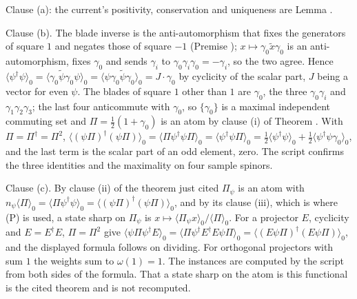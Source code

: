 Clause (a): the current's positivity, conservation and uniqueness are Lemma .

Clause (b). The blade inverse is the anti-automorphism that fixes the generators of square $1$ and negates those of square $-1$ (Premise ); $x \mapsto \gamma_{0}\tilde{x}\gamma_{0}$ is an anti-automorphism, fixes $\gamma_{0}$ and sends $\gamma_{i}$ to $\gamma_{0}\gamma_{i}\gamma_{0} = -\gamma_{i}$, so the two agree. Hence $\langle\psi^{\dagger}\psi\rangle_{0} = \langle\gamma_{0}\tilde{\psi}\gamma_{0}\psi\rangle_{0} = \langle\psi\gamma_{0}\tilde{\psi}\gamma_{0}\rangle_{0} = J \cdot \gamma_{0}$ by cyclicity of the scalar part, $J$ being a vector for even $\psi$. The blades of square $1$ other than $1$ are $\gamma_{0}$, the three $\gamma_{0}\gamma_{i}$ and $\gamma_{1}\gamma_{2}\gamma_{3}$; the last four anticommute with $\gamma_{0}$, so $\{\gamma_{0}\}$ is a maximal independent commuting set and $\Pi = \tfrac12(1 + \gamma_{0})$ is an atom by clause (i) of Theorem . With $\Pi = \Pi^{\dagger} = \Pi^{2}$, $\langle(\psi\Pi)^{\dagger}(\psi\Pi)\rangle_{0} = \langle\Pi\psi^{\dagger}\psi\Pi\rangle_{0} = \langle\psi^{\dagger}\psi\Pi\rangle_{0} = \tfrac12\langle\psi^{\dagger}\psi\rangle_{0} + \tfrac12\langle\psi^{\dagger}\psi\gamma_{0}\rangle_{0}$, and the last term is the scalar part of an odd element, zero. The script confirms the three identities and the maximality on four sample spinors.

Clause (c). By clause (ii) of the theorem just cited $\Pi_{\psi}$ is an atom with $n_{\psi}\langle\Pi\rangle_{0} = \langle\Pi\psi^{\dagger}\psi\rangle_{0} = \langle(\psi\Pi)^{\dagger}(\psi\Pi)\rangle_{0}$, and by its clause (iii), which is where (P) is used, a state sharp on $\Pi_{\psi}$ is $x \mapsto \langle\Pi_{\psi}x\rangle_{0}/\langle\Pi\rangle_{0}$. For a projector $E$, cyclicity and $E = E^{\dagger}E$, $\Pi = \Pi^{2}$ give $\langle\psi\Pi\psi^{\dagger}E\rangle_{0} = \langle\Pi\psi^{\dagger}E^{\dagger}E\psi\Pi\rangle_{0} = \langle(E\psi\Pi)^{\dagger}(E\psi\Pi)\rangle_{0}$, and the displayed formula follows on dividing. For orthogonal projectors with sum $1$ the weights sum to $\omega(1) = 1$. The instances are computed by the script from both sides of the formula. That a state sharp on the atom is this functional is the cited theorem and is not recomputed.

